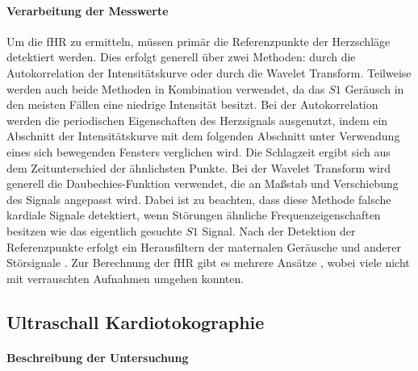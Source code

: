 \documentclass[10pt,a4paper,headinclude,twoside, plainheadsepline, open=right, numbers=noenddot, twocolumn]{article}
\begin{document}
\paragraph{Verarbeitung der Messwerte}

Um die fHR zu ermitteln, müssen primär die Referenzpunkte der Herzschläge detektiert werden.
Dies erfolgt generell über zwei Methoden: durch die Autokorrelation der Intensitätskurve oder durch die Wavelet Transform.
Teilweise werden auch beide Methoden in Kombination verwendet, da das $S1$ Geräusch in den meisten Fällen eine niedrige Intensität besitzt.
Bei der Autokorrelation werden die periodischen Eigenschaften des Herzsignals ausgenutzt, indem ein Abschnitt der Intensitätskurve mit dem folgenden Abschnitt unter Verwendung eines sich bewegenden Fensters verglichen wird.
Die Schlagzeit ergibt sich aus dem Zeitunterschied der ähnlichsten Punkte.
Bei der Wavelet Transform wird generell die Daubechies-Funktion \cite{daubechies1988orthonormal} verwendet, die an Maßstab und Verschiebung des Signals angepasst wird.
Dabei ist zu beachten, dass diese Methode falsche kardiale Signale detektiert, wenn Störungen ähnliche Frequenzeigenschaften besitzen wie das eigentlich gesuchte $S1$ Signal.
Nach der Detektion der Referenzpunkte erfolgt ein Herausfiltern der maternalen Geräusche und anderer Störsignale \cite{kovacs2011fetal}.
Zur Berechnung der fHR gibt es mehrere Ansätze \cite{godinez2003line, kovacs2000rule, talbert1986wide, jimenez2001performance, tan2000real, kovacs1998improved}, wobei viele nicht mit verrauschten Aufnahmen umgehen konnten.



\subsection{Ultraschall Kardiotokographie}
\label{ctg}

\paragraph{Beschreibung der Untersuchung}
\end{document}
